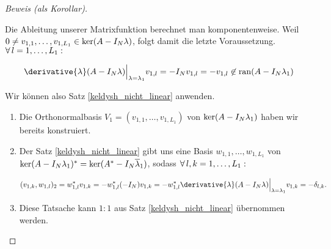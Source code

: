 \begin{proof}[Beweis (als Korollar)]
\begin{enumerate}[label = \arabic*.]
        Die Ableitung unserer Matrixfunktion berechnet man komponentenweise.
        Weil $0 \neq v_{1, 1}, \dots, v_{1, L_1} \in \operatorname{ker}(A - I_N \lambda)$, folgt damit die letzte Voraussetzung.
        $\forall \, l = 1, \dots, L_1:$

        \begin{align*}
            \derivative{\lambda} (A - I_N \lambda) \Big |_{\lambda = \lambda_1} v_{1, l}
            =
            -I_N v_{1, l}
            =
            -v_{1, l}
            \not \in
            \ran(A - I_N \lambda_1)
        \end{align*}

    \end{enumerate}

    Wir können also Satz \ref{keldysh_nicht_linear} anwenden.
    
    \begin{enumerate}[label = (\roman*)]

        \item Die Orthonormalbasis $V_1 = (v_{1, 1}, \dots, v_{1, L_1})$ von $\operatorname{ker}(A - I_N \lambda_1)$ haben wir bereits konstruiert.
        
        \item Der Satz \ref{keldysh_nicht_linear} gibt uns eine Basis $w_{1, 1}, \dots, w_{1, L_1}$ von $\operatorname{ker}(A - I_N \lambda_1)^\ast = \operatorname{ker}(A^\ast - I_N \overline \lambda_1)$, sodass $\forall \, l, k = 1, \dots, L_1:$
        
        \begin{align*}
            (v_{1, k}, w_{1, l})_2
            =
            w_{1, l}^\ast v_{1, k}
            =
            -w_{1, l}^\ast (-I_N) v_{1, k}
            =
            -w_{1, l}^\ast \derivative{\lambda} (A - I_N \lambda) \Big |_{\lambda = \lambda_1} v_{1, k}
            =
            -\delta_{l, k}.
        \end{align*}

        \item Diese Tatsache kann $1 : 1$ aus Satz \ref{keldysh_nicht_linear} übernommen werden.

    \end{enumerate}
    
\end{proof}

